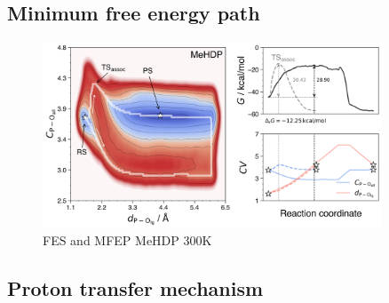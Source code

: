 

\subsection{Minimum free energy path}

\begin{figure}[ht]
    \centering
    \includegraphics[width=0.9\textwidth]{Figures/4_Results/results_MeHDP_300K_fes_mfep.png}
    \caption{FES and MFEP MeHDP 300K}
    \label{fig:mehdp_300k_fes_mfep}
\end{figure}


\subsection{Proton transfer mechanism}



